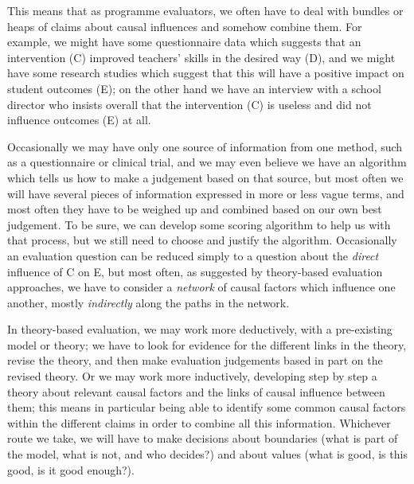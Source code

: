 \documentclass[
]{book}
\begin{document}
This means that as programme evaluators, we often have to deal with bundles or heaps of claims about causal influences and somehow combine them. For example, we might have some questionnaire data which suggests that an intervention (C) improved teachers' skills in the desired way (D), and we might have some research studies which suggest that this will have a positive impact on student outcomes (E); on the other hand we have an interview with a school director who insists overall that the intervention (C) is useless and did not influence outcomes (E) at all.

Occasionally we may have only one source of information from one method, such as a questionnaire or clinical trial, and we may even believe we have an algorithm which tells us how to make a judgement based on that source, but most often we will have several pieces of information expressed in more or less vague terms, and most often they have to be weighed up and combined based on our own best judgement. To be sure, we can develop some scoring algorithm to help us with that process, but we still need to choose and justify the algorithm. Occasionally an evaluation question can be reduced simply to a question about the \emph{direct} influence of C on E, but most often, as suggested by theory-based evaluation approaches, we have to consider a \emph{network} of causal factors which influence one another, mostly \emph{indirectly} along the paths in the network.

In theory-based evaluation, we may work more deductively, with a pre-existing model or theory; we have to look for evidence for the different links in the theory, revise the theory, and then make evaluation judgements based in part on the revised theory. Or we may work more inductively, developing step by step a theory about relevant causal factors and the links of causal influence between them; this means in particular being able to identify some common causal factors within the different claims in order to combine all this information. Whichever route we take, we will have to make decisions about boundaries (what is part of the model, what is not, and who decides?) and about values (what is good, is this good, is it good enough?).
\end{document}
